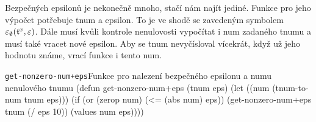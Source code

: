 Bezpečných epsilonů je nekonečně mnoho, stačí nám najít jediné. Funkce pro jeho výpočet potřebuje tnum a epsilon. To je ve shodě se zavedeným symbolem $\varepsilon_\emptyset(\mathfrak{t}^{x}, \varepsilon)$. Dále musí kvůli kontrole nenulovosti vypočítat i num zadaného tnumu a musí také vracet nové epsilon. Aby se tnum nevyčísloval vícekrát, když už jeho hodnotu známe, vrací funkce i tento num.

\begin{lispcode}{\texttt{get-nonzero-num+eps}}{Funkce pro nalezení bezpečného epsilonu a numu nenulového tnumu}
(\textcolor{funkcionalni}{defun} \textcolor{pojmenovan}{get-nonzero-num+eps} (tnum eps)
  (\textcolor{vedlejsi}{let} ((num (\textcolor{moje}{tnum-to-num} tnum eps)))
    (\textcolor{funkcionalni}{if} (\textcolor{funkcionalni}{or} (\textcolor{funkcionalni}{zerop} num) (\textcolor{matematicke}{<=} (\textcolor{matematicke}{abs} num) eps))
        (\textcolor{moje}{get-nonzero-num+eps} tnum (\textcolor{matematicke}{/} eps 10))
      (\textcolor{matematicke}{values} num eps))))
\end{lispcode}

